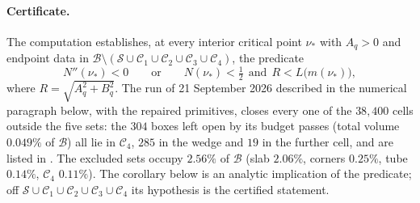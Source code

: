 \documentclass[11pt]{article}
\theoremstyle{remark}
\begin{document}
\paragraph{Certificate.}
The computation establishes, at every interior critical
point $\nu_*$ with $A_q>0$ and endpoint data in
$\mathcal B\setminus(\mathcal S\cup\mathcal C_1\cup\mathcal C_2\cup\mathcal C_3\cup\mathcal C_4)$,
the predicate
\begin{equation}\label{eq:verified-predicate}
 N''(\nu_*)<0\qquad\text{or}\qquad
 N(\nu_*)<\tfrac12\ \ \text{and}\ \ R<L\bigl(m(\nu_*)\bigr),
\end{equation}
where $R=\sqrt{A_q^2+B_q^2}$.  The run of 21 September 2026 described in
the numerical paragraph below, with the repaired primitives, closes every
one of the $38{,}400$ cells outside the five sets: the $304$ boxes left
open by its budget passes (total volume $0.049\%$ of $\mathcal B$) all lie
in $\mathcal C_4$, $285$ in the wedge and $19$ in the further cell, and
are listed in .  The excluded
sets occupy $2.56\%$ of $\mathcal B$ (slab $2.06\%$, corners $0.25\%$,
tube $0.14\%$, $\mathcal C_4$ $0.11\%$).
The corollary below is an analytic implication of the predicate; off
$\mathcal S\cup\mathcal C_1\cup\mathcal C_2\cup\mathcal C_3\cup\mathcal C_4$
its hypothesis is the certified statement.
\end{document}
